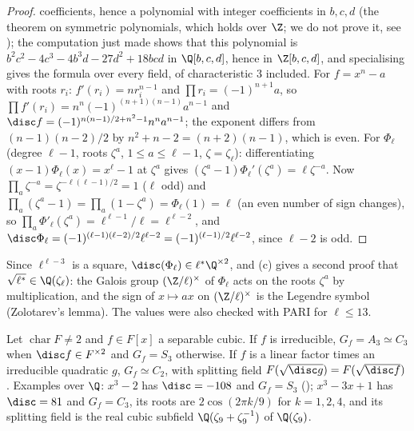 \begin{proof}
coefficients, hence a polynomial with integer coefficients in $b,c,d$ (the theorem on symmetric polynomials, which holds over $\Z$; we do not prove it, see
\cite[Chapter IV, Section 6]{Lang}); the computation just made shows that this polynomial is $b^2c^2-4c^3-4b^3d-27d^2+18bcd$ in $\Q[b,c,d]$, hence in $\Z[b,c,d]$, and
specialising gives the formula over every field, of characteristic $3$ included. For $f=x^n-a$ with roots $r_i$: $f'(r_i)=nr_i^{n-1}$ and $\prod r_i=(-1)^{n+1}a$, so
$\prod f'(r_i)=n^n(-1)^{(n+1)(n-1)}a^{n-1}$ and $\disc f=(-1)^{n(n-1)/2+n^2-1}n^na^{n-1}$; the exponent differs from $(n-1)(n-2)/2$ by $n^2+n-2=(n+2)(n-1)$, which is even.
For $\Phi_\ell$ (degree $\ell-1$, roots $\zeta^a$, $1\le a\le\ell-1$, $\zeta=\zeta_\ell$): differentiating $(x-1)\Phi_\ell(x)=x^\ell-1$ at $\zeta^a$ gives
$(\zeta^a-1)\Phi_\ell'(\zeta^a)=\ell\zeta^{-a}$. Now $\prod_a\zeta^{-a}=\zeta^{-\ell(\ell-1)/2}=1$ ($\ell$ odd) and $\prod_a(\zeta^a-1)=\prod_a(1-\zeta^a)=\Phi_\ell(1)=\ell$ (an even
number of sign changes), so $\prod_a\Phi'_\ell(\zeta^a)=\ell^{\ell-1}/\ell=\ell^{\ell-2}$, and $\disc\Phi_\ell=(-1)^{(\ell-1)(\ell-2)/2}\ell^{\ell-2}=(-1)^{(\ell-1)/2}\ell^{\ell-2}$,
since $\ell-2$ is odd.
\end{proof}

Since $\ell^{\ell-3}$ is a square, $\disc(\Phi_\ell)\in\ell^*\Q^{\times2}$, and (c) gives a second proof that $\sqrt{\ell^*}\in\Q(\zeta_\ell)$: the Galois group $(\Z/\ell)^\times$
of $\Phi_\ell$ acts on the roots $\zeta^a$ by multiplication, and the sign of $x\mapsto ax$ on $(\Z/\ell)^\times$ is the Legendre symbol (Zolotarev's lemma). The values
were also checked with PARI for $\ell\le13$.

\begin{proposition}[Cubics]\label{prop:galois:cubic}
Let $\operatorname{char}F\ne2$ and $f\in F[x]$ a separable cubic. If $f$ is irreducible, $G_f=A_3\simeq C_3$ when $\disc f\in F^{\times2}$ and $G_f=S_3$ otherwise. If
$f$ is a linear factor times an irreducible quadratic $g$, $G_f\simeq C_2$, with splitting field $F(\sqrt{\disc g})=F(\sqrt{\disc f})$. Examples over $\Q$:
$x^3-2$ has $\disc=-108$ and $G_f=S_3$ (); $x^3-3x+1$ has $\disc=81$ and $G_f=C_3$, its roots are $2\cos(2\pi k/9)$ for $k=1,2,4$, and its
splitting field is the real cubic subfield $\Q(\zeta_9+\zeta_9^{-1})$ of $\Q(\zeta_9)$.
\end{proposition}

